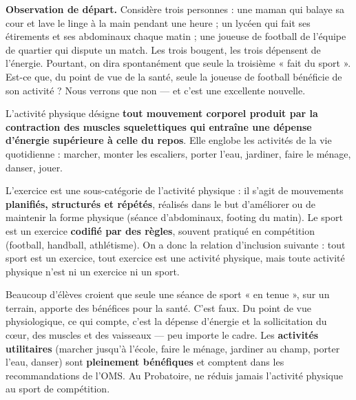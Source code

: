 \documentclass[11pt]{article}
\newcommand{\cle}[1]{{\popxbold\color{popdark}#1}}
\begin{document}
\textbf{Observation de départ.} Considère trois personnes : une maman qui balaye sa cour et lave le linge à la main pendant une heure ; un lycéen qui fait ses étirements et ses abdominaux chaque matin ; une joueuse de football de l'équipe de quartier qui dispute un match. Les trois bougent, les trois dépensent de l'énergie. Pourtant, on dira spontanément que seule la troisième « fait du sport ». Est-ce que, du point de vue de la santé, seule la joueuse de football bénéficie de son activité ? Nous verrons que non — et c'est une excellente nouvelle.

\begin{definition}
L'\cle{activité physique} désigne \textbf{tout mouvement corporel produit par la contraction des muscles squelettiques qui entraîne une dépense d'énergie supérieure à celle du repos}. Elle englobe les activités de la vie quotidienne : marcher, monter les escaliers, porter l'eau, jardiner, faire le ménage, danser, jouer.
\end{definition}

\begin{definition}
L'\cle{exercice} est une sous-catégorie de l'activité physique : il s'agit de mouvements \textbf{planifiés, structurés et répétés}, réalisés dans le but d'améliorer ou de maintenir la forme physique (séance d'abdominaux, footing du matin). Le \cle{sport} est un exercice \textbf{codifié par des règles}, souvent pratiqué en compétition (football, handball, athlétisme). On a donc la relation d'inclusion suivante : tout sport est un exercice, tout exercice est une activité physique, mais toute activité physique n'est ni un exercice ni un sport.
\end{definition}

\begin{attention}
Beaucoup d'élèves croient que seule une séance de sport « en tenue », sur un terrain, apporte des bénéfices pour la santé. C'est faux. Du point de vue physiologique, ce qui compte, c'est la \cle{dépense d'énergie} et la sollicitation du cœur, des muscles et des vaisseaux — peu importe le cadre. Les \textbf{activités utilitaires} (marcher jusqu'à l'école, faire le ménage, jardiner au champ, porter l'eau, danser) sont \textbf{pleinement bénéfiques} et comptent dans les recommandations de l'OMS. Au Probatoire, ne réduis jamais l'activité physique au sport de compétition.
\end{attention}
\end{document}
